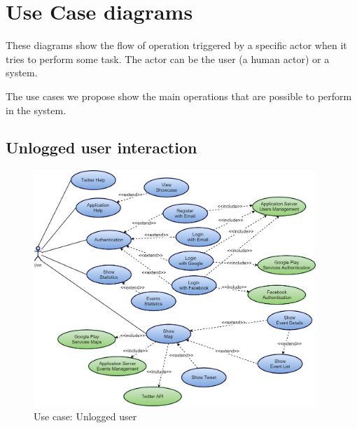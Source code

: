 \documentclass[a4paper]{scrreprt}
\begin{document}
\section{Use Case diagrams}
These diagrams show the flow of operation triggered by a specific actor when it tries to perform some task. The actor can be the user (a human actor) or a system.
\par The use cases we propose show the main operations that are possible to perform in the system.
\subsection{Unlogged user interaction}
\begin{figure}[H]
	\centering
	\includegraphics[width=0.95\textwidth]{diagrams/use_case/unlogged_user.png}
	\caption{Use case: Unlogged user}
\end{figure}
\end{document}
